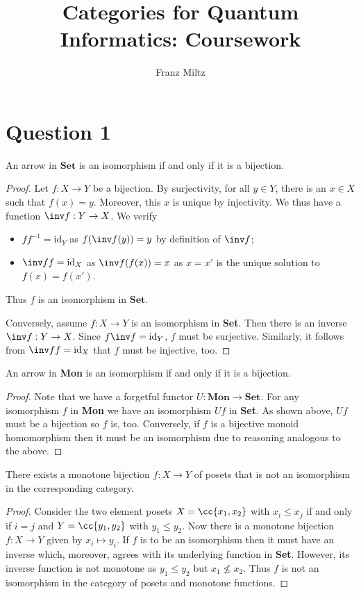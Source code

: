 \documentclass{article}
\title{Categories for Quantum Informatics: Coursework}
\author{Franz Miltz}
\begin{document}
\maketitle

\section*{Question 1}

\begin{claim*}[a]
  An arrow in $\textbf{Set}$ is an isomorphism if and only if it is a bijection.
  \begin{proof}
    Let $f:X\to Y$ be a bijection. By surjectivity, for all $y\in Y$, there is an $x\in X$
    such that $f(x)=y$. Moreover, this $x$ is unique by injectivity. We thus have a function
    $\inv f : Y\to X$. We verify
    \begin{itemize}
      \item $ff^{-1}=\text{id}_Y$ as $f(\inv f(y)) = y$ by definition of $\inv f$;
      \item $\inv ff=\text{id}_X$ as $\inv f(f(x)) = x$ as $x=x'$ is the unique
        solution to $f(x)=f(x')$.
    \end{itemize}
    Thus $f$ is an isomorphism in $\textbf{Set}$.

    Conversely, assume $f:X\to Y$ is an isomorphism in \textbf{Set}. Then there is an
    inverse $\inv f:Y\to X$. Since $f\inv f=\text{id}_Y$, $f$ must be surjective.
    Similarly, it follows from $\inv ff=\text{id}_X$ that $f$ must be injective, too.
  \end{proof}
\end{claim*}

\begin{claim*}[b]
  An arrow in \textbf{Mon} is an isomorphism if and only if it is a bijection.
  \begin{proof}
    Note that we have a forgetful functor $U:\textbf{Mon}\to\textbf{Set}$. For any
    isomorphism $f$ in \textbf{Mon} we have an isomorphism $Uf$ in \textbf{Set}. As
    shown above, $Uf$ must be a bijection so $f$ is, too. Conversely, if $f$ is a
    bijective monoid homomorphism then it must be an isomorphism due to reasoning
    analogous to the above.
  \end{proof}
\end{claim*}

\begin{claim*}[c]
  There exists a monotone bijection $f:X\to Y$ of posets that is not an isomorphism in the corresponding
  category.
  \begin{proof}
    Consider the two element posets $X=\cc{x_1,x_2}$ with $x_i\leq x_j$ if and only if $i=j$
    and $Y=\cc{y_1,y_2}$ with $y_1\leq y_2$. Now there is a monotone bijection
    $f:X\to Y$ given by $x_i\mapsto y_i$. If $f$ is to be an isomorphism then it must have
    an inverse which, moreover, agrees with its underlying function in \textbf{Set}.
    However, its inverse function is not monotone as $y_1\leq y_2$
    but $x_1\not\leq x_2$. Thus $f$ is not an isomorphism in the category of posets and
    monotone functions.
  \end{proof}
\end{claim*}
\end{document}
